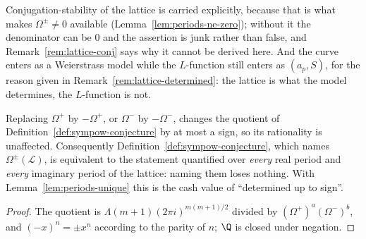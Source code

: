 \begin{definition}
  Conjugation-stability of the lattice is carried explicitly, because that is what makes
  $\Omega^{\pm} \neq 0$ available (Lemma~\ref{lem:periods-ne-zero}); without it the
  denominator can be $0$ and the assertion is junk rather than false, and
  Remark~\ref{rem:lattice-conj} says why it cannot be derived here. And the curve enters as a
  Weierstrass model while the $L$-function still enters as $(a_{p}, S)$, for the reason given in
  Remark~\ref{rem:lattice-determined}: the lattice is what the model determines, the
  $L$-function is not.
\end{definition}

\begin{corollary}
  \label{cor:sign-invisible}
  Replacing $\Omega^{+}$ by $-\Omega^{+}$, or $\Omega^{-}$ by $-\Omega^{-}$, changes the
  quotient of Definition~\ref{def:sympow-conjecture} by at most a sign, so its rationality is
  unaffected. Consequently Definition~\ref{def:sympow-conjecture}, which names
  $\Omega^{\pm}(\mathcal{L})$, is equivalent to the statement quantified over \emph{every} real
  period and \emph{every} imaginary period of the lattice: naming them loses nothing. With
  Lemma~\ref{lem:periods-unique} this is the cash value of ``determined up to sign''.
\end{corollary}
\begin{proof}
  The quotient is $\Lambda(m+1)(2\pi i)^{m(m+1)/2}$ divided by
  $(\Omega^{+})^{a}(\Omega^{-})^{b}$, and $(-x)^{n} = \pm x^{n}$ according to the parity of
  $n$; $\Q$ is closed under negation.
\end{proof}

